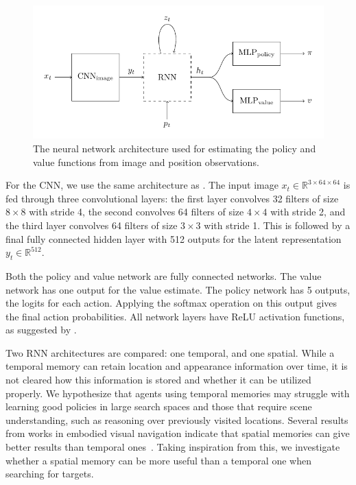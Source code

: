 \begin{figure}
    \centering
    \includegraphics{figures/architecture.pdf}
    \caption[Network architecture]{The neural network architecture used for estimating the policy and value functions from image and position observations.}
    \label{fig:architecture}
\end{figure}

For the CNN, we use the same architecture as \cite{mnih_human-level_2015}.
The input image \(x_t \in \mathbb{R}^{3 \times 64 \times 64}\) is fed through three convolutional layers: the first layer convolves 32 filters of size \(8 \times 8\) with stride 4, the second convolves 64 filters of size \(4 \times 4\) with stride 2, and the third layer convolves 64 filters of size \(3 \times 3\) with stride 1.
This is followed by a final fully connected hidden layer with 512 outputs for the latent representation \(y_t \in \mathbb{R}^{512}\).

Both the policy and value network are fully connected networks.
The value network has one output for the value estimate.
The policy network has 5 outputs, the logits for each action.
Applying the softmax operation on this output gives the final action probabilities.
All network layers have ReLU activation functions, as suggested by \cite{henderson_deep_2018}.

Two RNN architectures are compared: one temporal, and one spatial.
While a temporal memory can retain location and appearance information over time, it is not cleared how this information is stored and whether it can be utilized properly.
We hypothesize that agents using temporal memories may struggle with learning good policies in large search spaces and those that require scene understanding, such as reasoning over previously visited locations.
Several results from works in embodied visual navigation indicate that spatial memories can give better results than temporal ones~\cite{parisotto_neural_2017,henriques_mapnet_2018,gupta_cognitive_2019,chaplot_object_2020}.
Taking inspiration from this, we investigate whether a spatial memory can be more useful than a temporal one when searching for targets.

